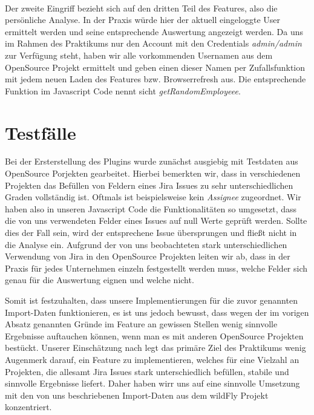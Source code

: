 \documentclass[a4paper,12pt,]{article}
\begin{document}
\paragraph{}Der zweite Eingriff bezieht sich auf den dritten Teil des Features, also die persönliche Analyse. In der Praxis würde hier der aktuell eingeloggte User ermittelt werden und seine entsprechende Auswertung angezeigt werden. Da uns im Rahmen des Praktikums nur den Account mit den Credentials \textit{admin/admin} zur Verfügung steht, haben wir alle vorkommenden Usernamen aus dem OpenSource Projekt ermittelt und geben einen dieser Namen per Zufallsfunktion mit jedem neuen Laden des Features bzw. Browserrefresh aus. Die entsprechende Funktion im Javascript Code nennt sicht \textit{getRandomEmployeee}.

\section{Testfälle}

Bei der Ersterstellung des Plugins wurde zunächst ausgiebig mit Testdaten aus OpenSource Porjekten gearbeitet.
Hierbei bemerkten wir, dass in verschiedenen Projekten das Befüllen von Feldern eines Jira Issues zu sehr unterschiedlichen Graden vollständig ist. Oftmals ist beispielsweise kein \textit{Assignee} zugeordnet. Wir haben also in unseren Javascript Code die Funktionalitäten so umgesetzt, dass die von uns verwendeten Felder eines Issues auf null Werte geprüft werden. Sollte dies der Fall sein, wird der entsprechene Issue übersprungen und fließt nicht in die Analyse ein. Aufgrund der von uns beobachteten stark unterschiedlichen Verwendung von Jira in den OpenSource Projekten leiten wir ab, dass in der Praxis für jedes Unternehmen einzeln festgestellt werden muss, welche Felder sich genau für die Auswertung eignen und welche nicht. 

Somit ist festzuhalten, dass unsere Implementierungen für die zuvor genannten Import-Daten funktionieren, es ist uns jedoch bewusst, dass wegen der im vorigen Absatz genannten Gründe im Feature an gewissen Stellen wenig sinnvolle Ergebnisse auftauchen können, wenn man es mit anderen OpenSource Projekten bestückt. 
Unserer Einschätzung nach legt das primäre Ziel des Praktikums wenig Augenmerk darauf, ein Feature zu implementieren, welches für eine Vielzahl an Projekten, die allesamt Jira Issues stark unterschiedlich befüllen, stabile und sinnvolle Ergebnisse liefert. Daher haben wirr uns auf eine sinnvolle Umsetzung mit den von uns beschriebenen Import-Daten aus dem wildFly Projekt konzentriert.
\end{document}
